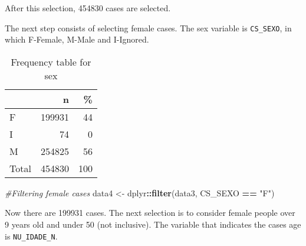 \documentclass[
]{article}
\newenvironment{Shaded}{\begin{snugshade}}{\end{snugshade}}
\newcommand{\CommentTok}[1]{\textcolor[rgb]{0.56,0.35,0.01}{\textit{#1}}}
\newcommand{\DataTypeTok}[1]{\textcolor[rgb]{0.13,0.29,0.53}{#1}}
\newcommand{\DecValTok}[1]{\textcolor[rgb]{0.00,0.00,0.81}{#1}}
\newcommand{\KeywordTok}[1]{\textcolor[rgb]{0.13,0.29,0.53}{\textbf{#1}}}
\newcommand{\NormalTok}[1]{#1}
\newcommand{\OperatorTok}[1]{\textcolor[rgb]{0.81,0.36,0.00}{\textbf{#1}}}
\newcommand{\OtherTok}[1]{\textcolor[rgb]{0.56,0.35,0.01}{#1}}
\newcommand{\StringTok}[1]{\textcolor[rgb]{0.31,0.60,0.02}{#1}}
\begin{document}
After this selection, 454830 cases are selected.

The next step consists of selecting female cases. The sex variable is
\texttt{CS\_SEXO}, in which F-Female, M-Male and I-Ignored.

\begin{Shaded}
\end{Shaded}

\begin{table}[!h]

\caption{\label{tab:unnamed-chunk-6}Frequency table for sex}
\centering
\begin{tabular}[t]{l|r|r}
\hline
  & n & \%\\
\hline
F & 199931 & 44\\
\hline
I & 74 & 0\\
\hline
M & 254825 & 56\\
\hline
Total & 454830 & 100\\
\hline
\end{tabular}
\end{table}

\begin{Shaded}
\begin{Highlighting}[]
\CommentTok{#Filtering female cases}
\NormalTok{data4 <-}\StringTok{ }\NormalTok{dplyr}\OperatorTok{::}\KeywordTok{filter}\NormalTok{(data3, CS_SEXO }\OperatorTok{==}\StringTok{ "F"}\NormalTok{)}
\end{Highlighting}
\end{Shaded}

Now there are 199931 cases. The next selection is to consider female
people over 9 years old and under 50 (not inclusive). The variable that
indicates the cases age is \texttt{NU\_IDADE\_N}.
\end{document}

